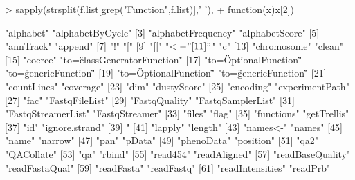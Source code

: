 \documentclass{beamer}
\begin{document}
\begin{frame}[fragile]
\begin{columns}
  \begin{column}{0.65\textwidth}
      \begin{uncoverenv}
\begin{Schunk}
\begin{Sinput}
> sapply(strsplit(f.list[grep("Function",f.list)],' '),
+        function(x)x[2])
\end{Sinput}
\begin{Soutput}
  [1] "alphabet"                      "alphabetByCycle"              
  [3] "alphabetFrequency"             "alphabetScore"                
  [5] "annTrack"                      "append"                       
  [7] "!"                             "["                            
  [9] "[["                            "$<-"                          
 [11] "$"                             "c"                            
 [13] "chromosome"                    "clean"                        
 [15] "coerce"                        "to=\"classGeneratorFunction\""
 [17] "to=\"OptionalFunction\""       "to=\"genericFunction\""       
 [19] "to=\"OptionalFunction\""       "to=\"genericFunction\""       
 [21] "countLines"                    "coverage"                     
 [23] "dim"                           "dustyScore"                   
 [25] "encoding"                      "experimentPath"               
 [27] "fac"                           "FastqFileList"                
 [29] "FastqQuality"                  "FastqSamplerList"             
 [31] "FastqStreamerList"             "FastqStreamer"                
 [33] "files"                         "flag"                         
 [35] "functions"                     "getTrellis"                   
 [37] "id"                            "ignore.strand"                
 [39] "%
 [41] "lapply"                        "length"                       
 [43] "names<-"                       "names"                        
 [45] "name"                          "narrow"                       
 [47] "pan"                           "pData"                        
 [49] "phenoData"                     "position"                     
 [51] "qa2"                           "QACollate"                    
 [53] "qa"                            "rbind"                        
 [55] "read454"                       "readAligned"                  
 [57] "readBaseQuality"               "readFastaQual"                
 [59] "readFasta"                     "readFastq"                    
 [61] "readIntensities"               "readPrb"                      

\end{Soutput}
\end{Schunk}
\end{uncoverenv}
\end{column}
\end{columns}
\end{frame}
\end{document}
